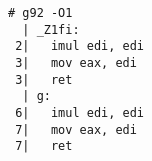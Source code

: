\begin{lstlisting}[language={},numbers=none,title=\href{https://godbolt.org/z/87z8vz}{\texttt{godbolt.org/z/87z8vz}}]
# g92 -O1
  | _Z1fi:
 2|   imul edi, edi
 3|   mov eax, edi
 3|   ret
  | g:
 6|   imul edi, edi
 7|   mov eax, edi
 7|   ret
\end{lstlisting}

